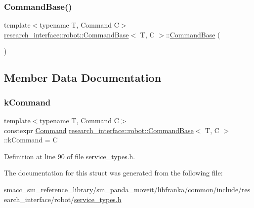 \subsubsection{\texorpdfstring{Command\+Base()}{CommandBase()}}
{\footnotesize\ttfamily template$<$typename T, Command C$>$ \\
\hyperlink{structresearch__interface_1_1robot_1_1CommandBase}{research\+\_\+interface\+::robot\+::\+Command\+Base}$<$ T, C $>$\+::\hyperlink{structresearch__interface_1_1robot_1_1CommandBase}{Command\+Base} (\begin{DoxyParamCaption}{ }\end{DoxyParamCaption})\hspace{0.3cm}{\ttfamily [delete]}}



\subsection{Member Data Documentation}
\mbox{\label{structresearch__interface_1_1robot_1_1CommandBase_a92be3ac33dc14e90a333dea827df76e6}} 
\subsubsection{\texorpdfstring{k\+Command}{kCommand}}
{\footnotesize\ttfamily template$<$typename T, Command C$>$ \\
constexpr \hyperlink{namespaceresearch__interface_1_1robot_a72624b344f0614e623ef21a53fb0aa50}{Command} \hyperlink{structresearch__interface_1_1robot_1_1CommandBase}{research\+\_\+interface\+::robot\+::\+Command\+Base}$<$ T, C $>$\+::k\+Command = C\hspace{0.3cm}{\ttfamily [static]}}



Definition at line 90 of file service\+\_\+types.\+h.



The documentation for this struct was generated from the following file\+:\begin{DoxyCompactItemize}
\item 
smacc\+\_\+sm\+\_\+reference\+\_\+library/sm\+\_\+panda\+\_\+moveit/libfranka/common/include/research\+\_\+interface/robot/\hyperlink{service__types_8h}{service\+\_\+types.\+h}\end{DoxyCompactItemize}
